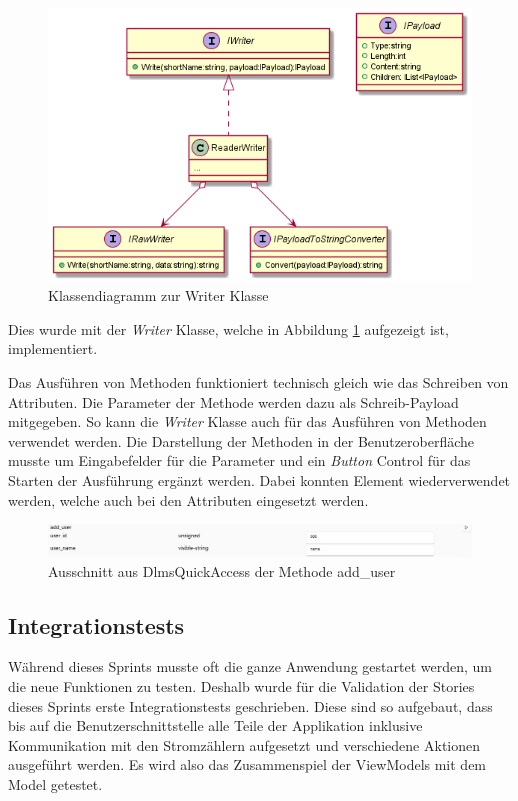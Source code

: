 \begin{figure}
   \centering
   \includegraphics[width=1.0\textwidth]{gfx/payloadTostriing.png}
   \caption{
      Klassendiagramm zur Writer Klasse
      }
      \label{fig:writer}
   \end{figure}
Dies wurde mit der \textit{Writer} Klasse, welche in Abbildung \ref{fig:writer} aufgezeigt ist, implementiert.


Das Ausführen von Methoden funktioniert technisch gleich wie das Schreiben von Attributen.
Die Parameter der Methode werden dazu als Schreib-Payload mitgegeben.
So kann die \textit{Writer} Klasse auch für das Ausführen von Methoden verwendet werden.
Die Darstellung der Methoden in der Benutzeroberfläche musste um Eingabefelder für die Parameter und ein \textit{Button} Control für das Starten der Ausführung ergänzt werden.
Dabei konnten Element wiederverwendet werden, welche auch bei den Attributen eingesetzt werden.
\begin{figure}
   \centering
   \includegraphics[width=1.0\textwidth]{gfx/addUserMethod.png}
   \caption{
      Ausschnitt aus DlmsQuickAccess der Methode add\_user
      }
      \label{fig:addUserMethod}
   \end{figure}



\subsection{Integrationstests}
Während dieses Sprints musste oft die ganze Anwendung gestartet werden, um die neue Funktionen zu testen.
Deshalb wurde für die Validation der Stories dieses Sprints erste Integrationstests geschrieben.
Diese sind so aufgebaut, dass bis auf die Benutzerschnittstelle alle Teile der Applikation inklusive Kommunikation mit den Stromzählern aufgesetzt und verschiedene Aktionen ausgeführt werden.
Es wird also das Zusammenspiel der ViewModels mit dem Model getestet.

